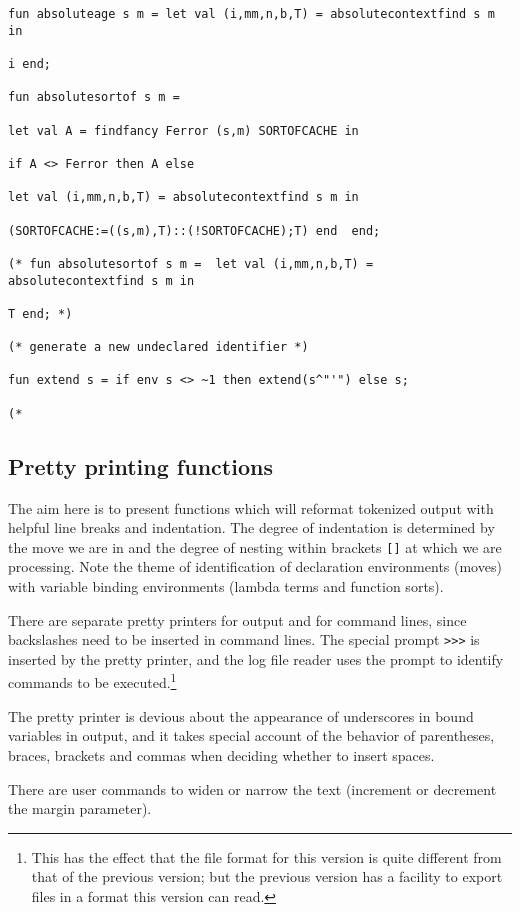 \documentclass[12pt]{article}
\begin{document}
\begin{verbatim}
fun absoluteage s m = let val (i,mm,n,b,T) = absolutecontextfind s m in

i end;

fun absolutesortof s m =  

let val A = findfancy Ferror (s,m) SORTOFCACHE in

if A <> Ferror then A else 

let val (i,mm,n,b,T) = absolutecontextfind s m in

(SORTOFCACHE:=((s,m),T)::(!SORTOFCACHE);T) end  end;

(* fun absolutesortof s m =  let val (i,mm,n,b,T) = absolutecontextfind s m in

T end; *)

(* generate a new undeclared identifier *)

fun extend s = if env s <> ~1 then extend(s^"'") else s;

(*

\end{verbatim}

\newpage

\subsection{Pretty printing functions}

The aim here is to present functions which will reformat tokenized output with helpful line
breaks and indentation.  The degree of indentation is determined by the move we are in and
the degree of nesting within brackets \verb|[]| at which we are processing.  Note the theme of identification of declaration environments (moves) with variable binding environments (lambda terms and function sorts).

There are separate pretty printers for output and for command lines, since backslashes need to be inserted in command lines.
The special prompt \verb|>>>|  is inserted by the pretty printer, and the log file reader uses the prompt to identify commands to be executed.\footnote{This has the effect that the file format for this version is quite different from that of the previous version;  but the previous version has a facility to export files in a format this version can read.}

The pretty printer is devious about the appearance of underscores in bound variables in output, and it takes special account of the behavior of parentheses,
braces, brackets and commas when deciding whether to insert spaces.

There are user commands to widen or narrow the text (increment or decrement the margin parameter).
\end{document}
